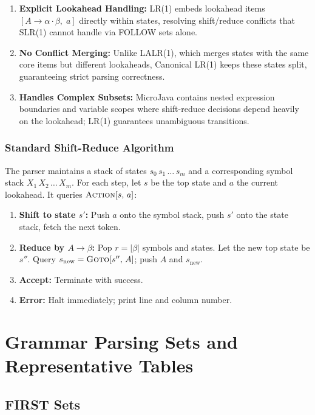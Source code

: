 \documentclass[11pt,a4paper]{article}
\begin{document}
\begin{enumerate}
  \item \textbf{Explicit Lookahead Handling:} LR(1) embeds lookahead items $[A \rightarrow \alpha \cdot \beta,\; a]$ directly within states, resolving shift/reduce conflicts that SLR(1) cannot handle via FOLLOW sets alone.
  \item \textbf{No Conflict Merging:} Unlike LALR(1), which merges states with the same core items but different lookaheads, Canonical LR(1) keeps these states split, guaranteeing strict parsing correctness.
  \item \textbf{Handles Complex Subsets:} MicroJava contains nested expression boundaries and variable scopes where shift-reduce decisions depend heavily on the lookahead; LR(1) guarantees unambiguous transitions.
\end{enumerate}

\subsubsection{Standard Shift-Reduce Algorithm}
The parser maintains a stack of states $s_0\,s_1\,\dots\,s_m$ and a corresponding symbol stack $X_1\,X_2\,\dots\,X_m$. For each step, let $s$ be the top state and $a$ the current lookahead. It queries $\textsc{Action}[s,\,a]$:

\begin{enumerate}
  \item \textbf{Shift to state $s'$:} Push $a$ onto the symbol stack, push $s'$ onto the state stack, fetch the next token.
  \item \textbf{Reduce by $A \rightarrow \beta$:} Pop $r = |\beta|$ symbols and states. Let the new top state be $s''$. Query $s_{\text{new}} = \textsc{Goto}[s'',\,A]$; push $A$ and $s_{\text{new}}$.
  \item \textbf{Accept:} Terminate with success.
  \item \textbf{Error:} Halt immediately; print line and column number.
\end{enumerate}

\newpage
\section{Grammar Parsing Sets and Representative Tables}

\subsection{FIRST Sets}
\end{document}
